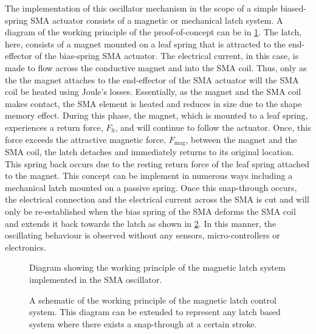The implementation of this oscillator mechanism in the scope of a simple biased-spring SMA actuator consists of a magnetic or mechanical latch system. A diagram of the working principle of the proof-of-concept can be in \cref{fig:oscillator-schematic}. The latch, here, consists of a magnet mounted on a leaf spring that is attracted to the end-effector of the bias-spring SMA actuator. The electrical current, in this case, is made to flow across the conductive magnet and into the SMA coil. Thus, only as the the magnet attaches to the end-effector of the SMA actuator will the SMA coil be heated using Joule's losses. Essentially, as the magnet and the SMA coil makes contact, the SMA element is heated and reduces in size due to the shape memory effect. During this phase, the magnet, which is mounted to a leaf spring, experiences a return force, $F_\textrm{S}$, and will continue to follow the actuator. Once, this force exceeds the attractive magnetic force, $F_\textrm{mag}$, between the magnet and the SMA coil, the latch detaches and immediately returns to its original location. This spring back occurs due to the resting return force of the leaf spring attached to the magnet. This concept can be implement in numerous ways including a mechanical latch mounted on a passive spring. Once this snap-through occurs, the electrical connection and the electrical current across the SMA is cut and will only be re-established when the bias spring of the SMA deforms the SMA coil and extends it back towards the latch as shown in \cref{fig:latch-wp}. In this manner, the oscillating behaviour is observed without any sensors, micro-controllers or electronics.

\begin{figure}[hbt!] %
  \centering
  \resizebox{0.6\textwidth}{!}{}
  \caption{Diagram showing the working principle of the magnetic latch system implemented in the SMA oscillator.}
  \label{fig:oscillator-schematic}
\end{figure}

\begin{figure}[hbt!] %
  \centering
  \resizebox{0.75\textwidth}{!}{}
  \caption{A schematic of the working principle of the magnetic latch control system. This diagram can be extended to represent any latch based system where there exists a snap-through at a certain stroke.}
  \label{fig:latch-wp}
\end{figure}

